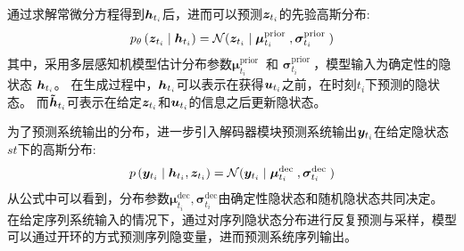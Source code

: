 通过求解常微分方程得到$\boldsymbol{h}_{t_i}$后，进而可以预测$\boldsymbol{z}_{t_i}$的先验高斯分布:
\begin{equation}
  p_{\theta}\left(\boldsymbol{z}_{t_{i}} \mid \boldsymbol{h}_{t_{i}}\right) = \mathcal{N}(\boldsymbol{z}_{t_i}\mid\boldsymbol{\mu}_{t_i}^{\text {prior }}, \boldsymbol{\sigma}_{t_i}^{\text {prior }})  
  \label{equ:prior_z}
\end{equation}
其中，采用多层感知机模型估计分布参数$\boldsymbol{\mu}_{t_i}^{\text {prior }}$ 和 $\boldsymbol{\sigma}_{t_i}^{\text {prior }}$，模型输入为确定性的隐状态 $\boldsymbol{h}_{t_i}$。
在生成过程中，$\boldsymbol{h}_{t_i}$可以表示在获得$\boldsymbol{u}_{t_i}$之前，在时刻$t_i$下预测的隐状态。
而$\boldsymbol{\tilde{h}}_{t_i}$可表示在给定$\boldsymbol{z}_{t_i}$和$\boldsymbol{u}_{t_i}$的信息之后更新隐状态。

为了预测系统输出的分布，进一步引入解码器模块预测系统输出$\boldsymbol{y}_{t_i}$在给定隐状态$st$下的高斯分布:
\begin{equation}
    p\left(\boldsymbol{y}_{t_{i}} \mid \boldsymbol{h}_{t_{i}}, \boldsymbol{z}_{t_i}\right) = \mathcal{N}(\boldsymbol{y}_{t_i} \mid\boldsymbol{\mu}_{t_i}^{\text {dec }}, \boldsymbol{\sigma}_{t_i}^{\text {dec }})
    \label{equ:output_layer}
\end{equation}
从公式中可以看到，分布参数$\boldsymbol{\mu}_{t_i}^{\text {dec}}, \boldsymbol{\sigma}_{t_i}^{\text {dec}}$由确定性隐状态和随机隐状态共同决定。
在给定序列系统输入的情况下，通过对序列隐状态分布进行反复预测与采样，模型可以通过开环的方式预测序列隐变量，进而预测系统序列输出。


